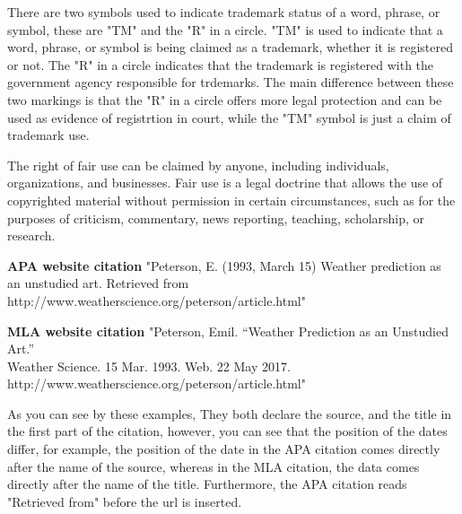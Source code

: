 \documentclass{report}
\begin{document}
    \bigbreak \noindent 

    There are two symbols used to indicate trademark status of a word, phrase, 
    or symbol, these are "TM" and the "R" in a circle. "TM" is used to indicate that a word, 
    phrase, or symbol is being claimed as a trademark, whether it is registered or not. The "R" 
    in a circle indicates that the trademark is registered with the government agency responsible for trdemarks. 
    The main difference between these two markings is that the "R" in a circle offers more legal protection 
    and can be used as evidence of registrtion in court, while the "TM" symbol is just a claim of trademark use.
    \bigbreak \noindent 

    The right of fair use can be claimed by anyone, including individuals, 
    organizations, and businesses. Fair use is a legal doctrine that allows the 
    use of copyrighted material without permission in certain circumstances, such as 
    for the purposes of criticism, commentary, news reporting, teaching, scholarship, 
    or research.    
    \bigbreak \noindent 

    \noindent \textbf{APA website citation}
    \bigbreak \noindent 
    "Peterson, E. (1993, March 15) Weather prediction as  \\
    an unstudied art. Retrieved from \\ 
    http://www.weatherscience.org/peterson/article.html"

    \bigbreak \noindent 
    \textbf{MLA website citation}
    \bigbreak \noindent 
    "Peterson, Emil. “Weather Prediction as an Unstudied Art.” \\ 
    Weather Science. 15 Mar. 1993. Web. 22 May 2017. \\ 
    http://www.weatherscience.org/peterson/article.html"

    \bigbreak
    As you can see by these examples, They both declare the source, and the title in the 
    first part of the citation, however, you can see that the position of the dates differ, 
    for example, the position of the date in the APA citation comes directly after the name of the source, 
    whereas in the MLA citation, the data comes directly after the name of the title. Furthermore, 
    the APA citation reads "Retrieved from" before the url is inserted. 
    \bigbreak \noindent 
\end{document}
